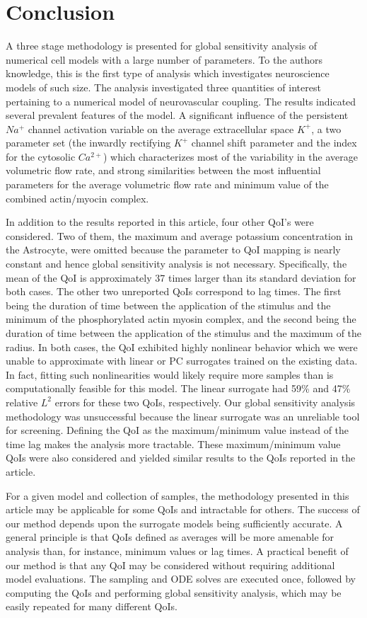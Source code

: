 \section{Conclusion}
 A three stage methodology is presented for global sensitivity analysis of numerical cell models with a large number of parameters. To the authors knowledge, this is the first type of analysis which investigates neuroscience models of such size. The analysis investigated three quantities of interest pertaining to a numerical model of neurovascular coupling. The results indicated several prevalent features of the model. A significant influence of the persistent $Na^+$ channel activation variable on the average extracellular space $K^+$, a two parameter set (the inwardly rectifying $K^+$ channel shift parameter and the index for the cytosolic $Ca^{2+}$) which characterizes most of the variability in the average volumetric flow rate, and strong similarities between the most influential parameters for the average volumetric flow rate and minimum value of the combined actin/myocin complex.
 
In addition to the results reported in this article, four other QoI's were considered. Two of them, the maximum and average potassium concentration in the Astrocyte, were omitted because the parameter to QoI mapping is nearly constant and hence global sensitivity analysis is not necessary. Specifically, the mean of the QoI is approximately 37 times larger than its standard deviation for both cases. The other two unreported QoIs correspond to lag times. The first being the duration of time between the application of the stimulus and the minimum of the phosphorylated actin myosin complex, and the second being the duration of time between the application of the stimulus and the maximum of the radius. In both cases, the QoI exhibited highly nonlinear behavior which we were unable to approximate with linear or PC surrogates trained on the existing data. In fact, fitting such nonlinearities would likely require more samples than is computationally feasible for this model. The linear surrogate had 59\% and 47\% relative $L^2$ errors for these two QoIs, respectively. Our global sensitivity analysis methodology was unsuccessful because the linear surrogate was an unreliable tool for screening. Defining the QoI as the maximum/minimum value instead of the time lag makes the analysis more tractable. These maximum/minimum value QoIs were also considered and yielded similar results to the QoIs reported in the article.

For a given model and collection of samples, the methodology presented in this article may be applicable for some QoIs and intractable for others. The success of our method depends upon the surrogate models being sufficiently accurate. A general principle is that QoIs defined as averages will be more amenable for analysis than, for instance, minimum values or lag times. A practical benefit of our method is that any QoI may be considered without requiring additional model evaluations. The sampling and ODE solves are executed once, followed by computing the QoIs and performing global sensitivity analysis, which may be easily repeated for many different QoIs.
 
